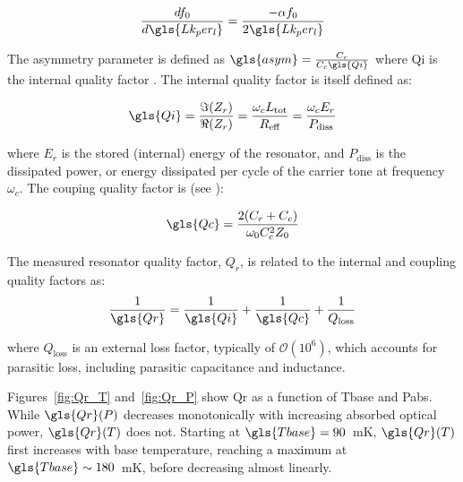 \begin{equation}
 \frac{df_{0}}{d\gls{Lk_per_l}} = \frac{-\alpha f_{0}}{2\gls{Lk_per_l}}
\end{equation}

The asymmetry parameter is defined as $\gls{asym} = \frac{C_{r}}{C_{c}\gls{Qi}}$
where \gls{Qi} is the internal quality factor \citep{mauskopf2018transition}. The internal quality factor is itself defined as:

\begin{equation}\label{eq:Qi}
  \gls{Qi} = \frac{\Im(Z_{r})}{\Re(Z_{r})} = \frac{\omega_{c}L_{\mathrm{tot}}}{R_{\mathrm{eff}}} = \frac{\omega_{c} E_{r}}{P_{\mathrm{diss}}}
\end{equation}

where $E_{r}$ is the stored (internal) energy of the resonator, and $P_{\mathrm{diss}}$ is the dissipated power, or energy dissipated per cycle of the carrier tone at frequency $\omega_{c}$. The couping quality factor is (see \citet{barry2014development}):

\begin{equation} \label{eq:Qc}
  \gls{Qc} = \frac{2(C_{r} + C_{c})}{\omega_{0}C_{c}^{2}Z_{0}}
\end{equation}

The measured resonator quality factor, $Q_{r}$, is related to the internal and coupling quality factors as:
\begin{equation}
  \frac{1}{\gls{Qr}} = \frac{1}{\gls{Qi}} + \frac{1}{\gls{Qc}} + \frac{1}{Q_{\mathrm{loss}}}
\end{equation}

where $Q_{\mathrm{loss}}$ is an external loss factor, typically of $\mathcal{O}(10^{6})$, which accounts for parasitic loss, including parasitic capacitance and inductance.

Figures~\ref{fig:Qr_T} and~\ref{fig:Qr_P} show \gls{Qr} as a function of \gls{Tbase} and \gls{Pabs}. While $\gls{Qr}(P)$ decreases monotonically with increasing absorbed optical power, $\gls{Qr}(T)$ does not. Starting at $\gls{Tbase} = 90$~mK, $\gls{Qr}(T)$ first increases with base temperature, reaching a maximum at $\gls{Tbase} \sim 180$~mK, before decreasing almost linearly.

